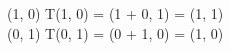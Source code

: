 (1, 0) \rightarrow T(1, 0) = (1 + 0, 1) = (1, 1) \\
(0, 1) \rightarrow T(0, 1) = (0 + 1, 0) = (1, 0)